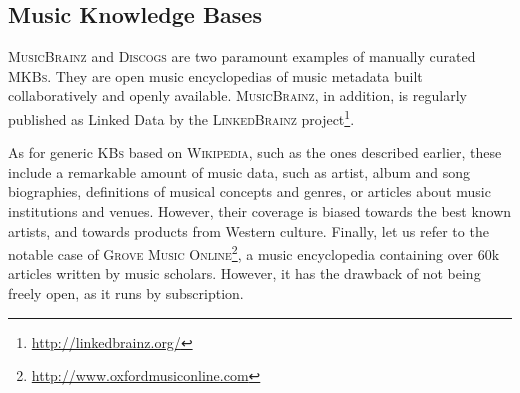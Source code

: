 

\subsection{Music Knowledge Bases}\label{sec:SOA:nlu:mkbs}

\textsc{MusicBrainz} and \textsc{Discogs} are two paramount examples of manually curated \textsc{MKBs}. They are open music encyclopedias of music metadata built collaboratively and openly available. \textsc{MusicBrainz}, in addition, is regularly published as Linked Data by the \textsc{LinkedBrainz} project\footnote{\url{http://linkedbrainz.org/}}.

As for generic \textsc{KBs} based on \textsc{Wikipedia}, such as the ones described earlier, these include a remarkable amount of music data, such as artist, album and song biographies, definitions of musical concepts and genres, or articles about music institutions and venues. However, their coverage is biased towards the best known artists, and towards products from Western culture. Finally, let us refer to the notable case of \textsc{Grove Music Online}\footnote{\url{http://www.oxfordmusiconline.com}}, a music encyclopedia containing over 60k articles written by music scholars. However, it has the drawback of not being freely open, as it runs by subscription.

